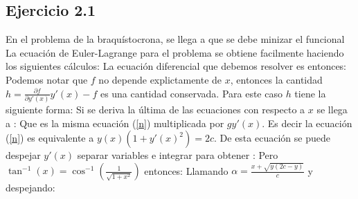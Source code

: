 
\subsection*{Ejercicio 2.1}
En el problema de la braqu\'istocrona, se llega a que se debe minizar el funcional
La ecuaci\'on de Euler-Lagrange para el problema se obtiene facilmente haciendo los siguientes c\'alculos:
La ecuaci\'on diferencial que debemos resolver es entonces:
Podemos notar que $f$ no depende explictamente de $x$, entonces la cantidad $h=\frac{\partial f}{\partial y'(x)}y'(x)-f$ es una cantidad conservada. Para este caso $h$ tiene la siguiente forma:
Si se deriva la \'ultima de las ecuaciones con respecto a $x$ se llega a :
Que es la misma ecuaci\'on (\ref{n}) multiplicada por $g y'(x)$. Es decir la ecuaci\'on (\ref{n}) es equivalente a $y(x) (1+y'(x)^2)=2c$. De esta ecuaci\'on se puede despejar $y'(x)$ separar variables e integrar para obtener :
Pero $\tan^{-1}(x)=\cos^{-1}\left(\frac{1}{\sqrt{1+x^2}}\right)$ entonces:
Llamando $\alpha=\frac{x+\sqrt{y(2c-y)}}{c}$ y despejando:
